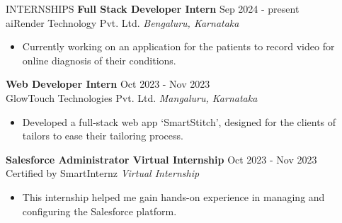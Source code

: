 \documentclass{resume} %
\begin{document}
\begin{rSection}{INTERNSHIPS}
    \textbf{Full Stack Developer Intern} \hfill Sep 2024 - present\\
    aiRender Technology Pvt. Ltd. \hfill \textit{Bengaluru, Karnataka}
    \begin{itemize}
        \itemsep -3pt {}
        \item Currently working on an application for the patients to record video for online diagnosis of their conditions.
    \end{itemize}

    \textbf{Web Developer Intern} \hfill Oct 2023 - Nov 2023\\
    GlowTouch Technologies Pvt. Ltd. \hfill \textit{Mangaluru, Karnataka}
    \begin{itemize}
        \itemsep -3pt {}
        \item Developed a full-stack web app `SmartStitch', designed for the clients of tailors to ease their tailoring process.
    \end{itemize}

    \textbf{Salesforce Administrator Virtual Internship} \hfill Oct 2023 - Nov 2023\\
    Certified by SmartInternz \hfill \textit{Virtual Internship}
    \begin{itemize}
        \itemsep -3pt {}
        \item This internship helped me gain hands-on experience in managing and configuring the Salesforce platform.
    \end{itemize}

\end{rSection}
\end{document}
